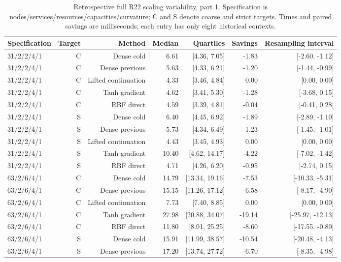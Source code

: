 \begin{table}[tbp]\centering\scriptsize
\caption{Retrospective full R22 scaling variability, part 1. Specification is nodes/services/resources/capacities/curvature; C and S denote coarse and strict targets. Times and paired savings are milliseconds; each entry has only eight historical contexts.}
\label{tab:r24-old-scaling-1}
\begin{tabular}{lrrrrrr}
\toprule
Specification & Target & Method & Median & Quartiles & Savings & Resampling interval\\
\midrule
31/2/2/4/1 & C & Dense cold & 6.61 & [4.36, 7.05] & -1.83 & [-2.60, -1.12]\\
31/2/2/4/1 & C & Dense previous & 5.63 & [4.33, 6.21] & -1.20 & [-1.44, -0.99]\\
31/2/2/4/1 & C & Lifted continuation & 4.33 & [3.46, 4.84] & 0.00 & [0.00, 0.00]\\
31/2/2/4/1 & C & Tanh gradient & 4.62 & [3.41, 5.30] & -1.28 & [-3.68, 0.15]\\
31/2/2/4/1 & C & RBF direct & 4.59 & [3.39, 4.81] & -0.04 & [-0.41, 0.28]\\
31/2/2/4/1 & S & Dense cold & 6.40 & [4.45, 6.92] & -1.89 & [-2.89, -1.10]\\
31/2/2/4/1 & S & Dense previous & 5.73 & [4.34, 6.49] & -1.23 & [-1.45, -1.01]\\
31/2/2/4/1 & S & Lifted continuation & 4.43 & [3.45, 4.93] & 0.00 & [0.00, 0.00]\\
31/2/2/4/1 & S & Tanh gradient & 10.40 & [4.62, 14.17] & -4.22 & [-7.02, -1.42]\\
31/2/2/4/1 & S & RBF direct & 4.71 & [4.26, 6.20] & -0.95 & [-2.74, 0.15]\\
63/2/6/4/1 & C & Dense cold & 14.79 & [13.34, 19.16] & -7.53 & [-10.33, -5.31]\\
63/2/6/4/1 & C & Dense previous & 15.15 & [11.26, 17.12] & -6.58 & [-8.17, -4.90]\\
63/2/6/4/1 & C & Lifted continuation & 7.73 & [7.40, 8.85] & 0.00 & [0.00, 0.00]\\
63/2/6/4/1 & C & Tanh gradient & 27.98 & [20.88, 34.07] & -19.14 & [-25.97, -12.13]\\
63/2/6/4/1 & C & RBF direct & 11.80 & [8.01, 25.25] & -8.60 & [-17.55, -0.80]\\
63/2/6/4/1 & S & Dense cold & 15.91 & [11.99, 38.57] & -10.54 & [-20.48, -4.13]\\
63/2/6/4/1 & S & Dense previous & 17.20 & [13.74, 27.72] & -6.70 & [-8.35, -4.98]\\

\end{tabular}
\end{table}
